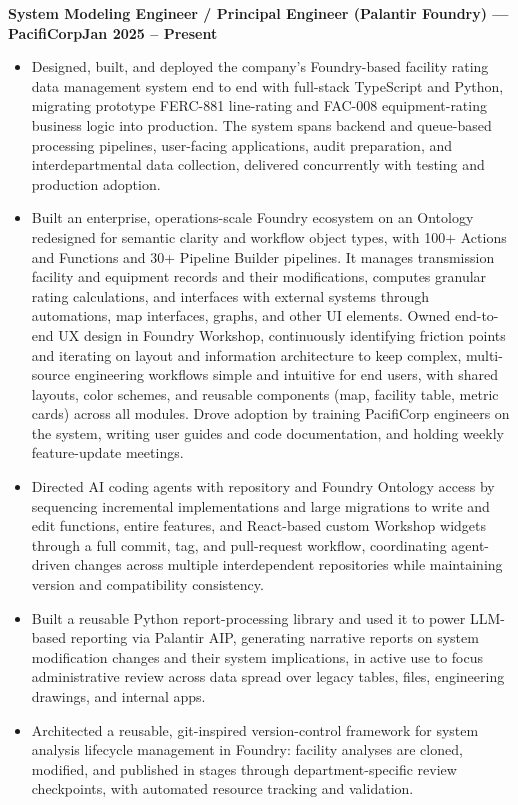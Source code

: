 \documentclass[10pt, letterpaper]{article}
\newcommand{\jobline}[2]{%
  \vspace{5pt}%
  \noindent\textbf{#1}\hfill\textbf{#2}\par%
  \vspace{1pt}%
}
\newenvironment{rlist}{%
  \begin{itemize}[leftmargin=1.4em, itemsep=1pt, topsep=2pt, parsep=0pt]%
}{%
  \end{itemize}%
}
\begin{document}
\jobline{System Modeling Engineer / Principal Engineer (Palantir Foundry) --- PacifiCorp}{Jan 2025 -- Present}
\begin{rlist}
  \item Designed, built, and deployed the company's Foundry-based facility rating data management system end to end with full-stack TypeScript and Python, migrating prototype FERC-881 line-rating and FAC-008 equipment-rating business logic into production. The system spans backend and queue-based processing pipelines, user-facing applications, audit preparation, and interdepartmental data collection, delivered concurrently with testing and production adoption.
  \item Built an enterprise, operations-scale Foundry ecosystem on an Ontology redesigned for semantic clarity and workflow object types, with 100+ Actions and Functions and 30+ Pipeline Builder pipelines. It manages transmission facility and equipment records and their modifications, computes granular rating calculations, and interfaces with external systems through automations, map interfaces, graphs, and other UI elements. Owned end-to-end UX design in Foundry Workshop, continuously identifying friction points and iterating on layout and information architecture to keep complex, multi-source engineering workflows simple and intuitive for end users, with shared layouts, color schemes, and reusable components (map, facility table, metric cards) across all modules. Drove adoption by training PacifiCorp engineers on the system, writing user guides and code documentation, and holding weekly feature-update meetings.
  \item Directed AI coding agents with repository and Foundry Ontology access by sequencing incremental implementations and large migrations to write and edit functions, entire features, and React-based custom Workshop widgets through a full commit, tag, and pull-request workflow, coordinating agent-driven changes across multiple interdependent repositories while maintaining version and compatibility consistency.
  \item Built a reusable Python report-processing library and used it to power LLM-based reporting via Palantir AIP, generating narrative reports on system modification changes and their system implications, in active use to focus administrative review across data spread over legacy tables, files, engineering drawings, and internal apps.
  \item Architected a reusable, git-inspired version-control framework for system analysis lifecycle management in Foundry: facility analyses are cloned, modified, and published in stages through department-specific review checkpoints, with automated resource tracking and validation.

\end{rlist}
\end{document}
